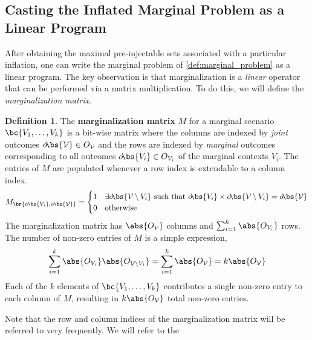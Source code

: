 \documentclass[aps, 10pt, english, twoside, pra, nofootinbib, longbibliography]{revtex4-1}
\theoremstyle{plain}
\theoremstyle{definition}
\newtheorem{definition}[theorem]{Definition}
\theoremstyle{remark}
\newcommand{\term}[1]{\textcolor{Mahogany}{\textbf{#1}}}
\newcommand{\outc}[1]{o\!\bs{#1}}
\begin{document}
    \subsection{Casting the Inflated Marginal Problem as a Linear Program}
    After obtaining the maximal pre-injectable sets associated with a particular inflation, one can write the marginal problem of \cref{def:marginal_problem} as a linear program. The key observation is that marginalization is a \textit{linear} operator that can be performed via a matrix multiplication. To do this, we will define the \textit{marginalization matrix}.
    \begin{definition}
        The \term{marginalization matrix} $M$ for a marginal scenario $\bc{V_1, \dots, V_k}$ is a bit-wise matrix where the columns are indexed by \textit{joint} outcomes $\outc{\mathcal{V}} \in O_{\mathcal{V}}$ and the rows are indexed by \textit{marginal} outcomes corresponding to all outcomes $\outc{V_i} \in O_{V_i}$ of the marginal contexts $V_i$. The entries of $M$ are populated whenever a row index is extendable to a column index.
        \[ M_{\br{o\bs{V_i}, o\bs{\mathcal{V}}}} = \begin{cases}
            1 & \exists \outc{\mathcal{V} \setminus V_i} \text{ such that } \outc{V_i} \times \outc{\mathcal{V} \setminus V_i} = \outc{\mathcal{V}} \\
            0 & \text{otherwise}
        \end{cases} \]
        The marginalization matrix has $\abs{O_\mathcal{V}}$ columns and $\sum_{i=1}^{k} \abs{O_{V_i}}$ rows. The number of non-zero entries of $M$ is a simple expression,
        \[ \sum_{i=1}^{k} \abs{O_{V_i}}\abs{O_{\mathcal{V} \setminus V_i}} = \sum_{i=1}^{k} \abs{O_{\mathcal{V}}} = k\abs{O_{\mathcal{V}}} \]
        Each of the $k$ elements of $\bc{V_1, \ldots, V_k}$ contributes a single non-zero entry to each column of $M$, resulting in $k\abs{O_\mathcal{V}}$ total non-zero entries.

        Note that the row and column indices of the marginalization matrix will be referred to very frequently. We will refer to the
    \end{definition}
\end{document}
